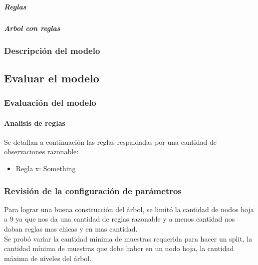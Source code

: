             \subparagraph{Reglas}
                

            \newpage
            \subparagraph{Arbol con reglas}

                \begin{figure}[ht]
                \end{figure}
                \FloatBarrier
                \newpage

    \subsubsection{Descripción del modelo}
\subsection{Evaluar el modelo}
    \subsubsection{Evaluación del modelo}
        \paragraph{Analisis de reglas}

            Se detallan a continuación las reglas respaldadas por una cantidad
            de observaciones razonable:
            \begin{itemize}
                \item Regla x:
                    Something
            \end{itemize}

    \subsubsection{Revisión de la configuración de parámetros}
        Para lograr una buena construcción del árbol, se limitó la cantidad de
        nodos hoja a 9 ya que nos da una cantidad de reglas razonable y a menos
        cantidad nos daban reglas mas chicas y en mas cantidad.\\
        Se probó variar la cantidad mínima de muestras requerida para hacer
        un split, la cantidad mínima de muestras que debe haber en un nodo
        hoja, la cantidad máxima de niveles del árbol.

